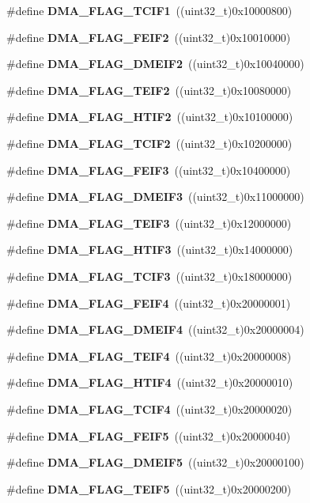 \begin{DoxyCompactItemize}
\#define \textbf{ D\+M\+A\+\_\+\+F\+L\+A\+G\+\_\+\+T\+C\+I\+F1}~((uint32\+\_\+t)0x10000800)
\item 
\#define \textbf{ D\+M\+A\+\_\+\+F\+L\+A\+G\+\_\+\+F\+E\+I\+F2}~((uint32\+\_\+t)0x10010000)
\item 
\#define \textbf{ D\+M\+A\+\_\+\+F\+L\+A\+G\+\_\+\+D\+M\+E\+I\+F2}~((uint32\+\_\+t)0x10040000)
\item 
\#define \textbf{ D\+M\+A\+\_\+\+F\+L\+A\+G\+\_\+\+T\+E\+I\+F2}~((uint32\+\_\+t)0x10080000)
\item 
\#define \textbf{ D\+M\+A\+\_\+\+F\+L\+A\+G\+\_\+\+H\+T\+I\+F2}~((uint32\+\_\+t)0x10100000)
\item 
\#define \textbf{ D\+M\+A\+\_\+\+F\+L\+A\+G\+\_\+\+T\+C\+I\+F2}~((uint32\+\_\+t)0x10200000)
\item 
\#define \textbf{ D\+M\+A\+\_\+\+F\+L\+A\+G\+\_\+\+F\+E\+I\+F3}~((uint32\+\_\+t)0x10400000)
\item 
\#define \textbf{ D\+M\+A\+\_\+\+F\+L\+A\+G\+\_\+\+D\+M\+E\+I\+F3}~((uint32\+\_\+t)0x11000000)
\item 
\#define \textbf{ D\+M\+A\+\_\+\+F\+L\+A\+G\+\_\+\+T\+E\+I\+F3}~((uint32\+\_\+t)0x12000000)
\item 
\#define \textbf{ D\+M\+A\+\_\+\+F\+L\+A\+G\+\_\+\+H\+T\+I\+F3}~((uint32\+\_\+t)0x14000000)
\item 
\#define \textbf{ D\+M\+A\+\_\+\+F\+L\+A\+G\+\_\+\+T\+C\+I\+F3}~((uint32\+\_\+t)0x18000000)
\item 
\#define \textbf{ D\+M\+A\+\_\+\+F\+L\+A\+G\+\_\+\+F\+E\+I\+F4}~((uint32\+\_\+t)0x20000001)
\item 
\#define \textbf{ D\+M\+A\+\_\+\+F\+L\+A\+G\+\_\+\+D\+M\+E\+I\+F4}~((uint32\+\_\+t)0x20000004)
\item 
\#define \textbf{ D\+M\+A\+\_\+\+F\+L\+A\+G\+\_\+\+T\+E\+I\+F4}~((uint32\+\_\+t)0x20000008)
\item 
\#define \textbf{ D\+M\+A\+\_\+\+F\+L\+A\+G\+\_\+\+H\+T\+I\+F4}~((uint32\+\_\+t)0x20000010)
\item 
\#define \textbf{ D\+M\+A\+\_\+\+F\+L\+A\+G\+\_\+\+T\+C\+I\+F4}~((uint32\+\_\+t)0x20000020)
\item 
\#define \textbf{ D\+M\+A\+\_\+\+F\+L\+A\+G\+\_\+\+F\+E\+I\+F5}~((uint32\+\_\+t)0x20000040)
\item 
\#define \textbf{ D\+M\+A\+\_\+\+F\+L\+A\+G\+\_\+\+D\+M\+E\+I\+F5}~((uint32\+\_\+t)0x20000100)
\item 
\#define \textbf{ D\+M\+A\+\_\+\+F\+L\+A\+G\+\_\+\+T\+E\+I\+F5}~((uint32\+\_\+t)0x20000200)

\end{DoxyCompactItemize}

